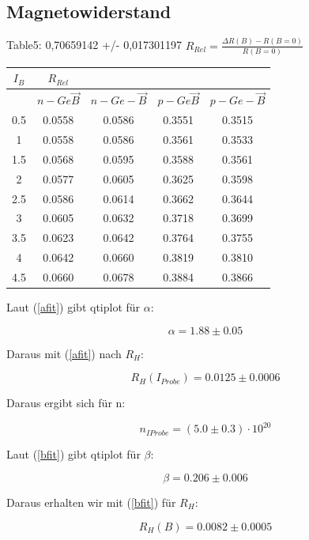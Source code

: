 \documentclass[12pt,a4paper,twopage]{article}
\begin{document}
\subsection*{Magnetowiderstand}
Table5: 0,70659142 +/- 0,017301197
$R_{Rel} = \frac{\Delta R(B)-R(B=0)}{R(B=0)}$
\begin{table}
\begin{tabular}{|c|c|c|c|c|}
\hline 
$I_B$ & $R_{Rel}$ \\
\hline  & $n-Ge \vec{B}$ & $n-Ge -\vec{B}$ & $p-Ge \vec{B}$ & $p-Ge -\vec{B}$ \\
0.5 & 0.0558 & 0.0586 & 0.3551 & 0.3515 \\ 
1 & 0.0558 & 0.0586 & 0.3561 & 0.3533 \\ 
1.5 & 0.0568 & 0.0595 & 0.3588 & 0.3561 \\ 
2 & 0.0577 & 0.0605 & 0.3625 & 0.3598 \\ 
2.5 & 0.0586 & 0.0614 & 0.3662 & 0.3644 \\ 
3 & 0.0605 & 0.0632 & 0.3718 & 0.3699 \\ 
3.5 & 0.0623 & 0.0642 & 0.3764 & 0.3755 \\ 
4 & 0.0642 & 0.0660 & 0.3819 & 0.3810 \\ 
4.5 & 0.0660 & 0.0678 & 0.3884 & 0.3866 \\ 

\end{tabular}
\end{table}


Laut (\ref{afit}) gibt qtiplot für $\alpha$:

$$ \alpha = 1.88 \pm 0.05 $$

Daraus mit (\ref{afit}) nach $R_H$:

\begin{center}
$$ \boxed{ R_H(I_{Probe}) = 0.0125 \pm 0.0006 } $$
\end{center}

Daraus ergibt sich für n:

\begin{center}
$$ \boxed{ n_{IProbe} = (5.0 \pm 0.3) \cdot 10^{20}  } $$
\end{center}

Laut (\ref{bfit}) gibt qtiplot für $\beta$:

$$ \beta =  0.206 \pm 0.006 $$

Daraus erhalten wir mit (\ref{bfit}) für $R_H$:

\begin{center}
$$ \boxed{ R_H(B) = 0.0082 \pm 0.0005 } $$
\end{center}
\end{document}
